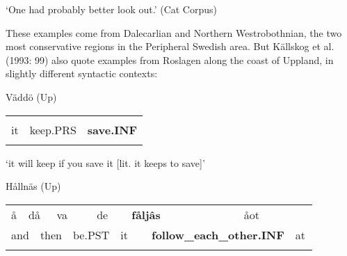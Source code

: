 \begin{styleTranslation}
‘One had probably better look out.’ (Cat Corpus)

\end{styleTranslation}

\begin{styleBodyTextFirst}
These examples come from Dalecarlian and Northern Westrobothnian, the two most conservative regions in the Peripheral Swedish area. But Källskog et al. (1993: 99) also quote examples from Roslagen along the coast of Uppland, in slightly different syntactic contexts:

\end{styleBodyTextFirst}

\begin{listWWNumileveli}
\item {}

\begin{styleExample}
Väddö (Up)

\end{styleExample}

\end{listWWNumileveli}

\begin{tabular}{lll}
\lsptoprule
\multicolumn{3}{l}{de

}\\
it & keep.PRS & {\bfseries save.INF}\\
\lspbottomrule
\end{tabular}

\begin{styleTranslation}
‘it will keep if you save it [lit. it keeps to save]’

\end{styleTranslation}

\begin{listWWNumileveli}
\item {}

\begin{styleExample}
Hållnäs (Up)

\end{styleExample}

\end{listWWNumileveli}

\begin{tabular}{llllllllllll}
\lsptoprule
å & \multicolumn{2}{l}{då

} & \multicolumn{2}{l}{va

} & \multicolumn{2}{l}{de

} & \multicolumn{2}{l}{{\bfseries fåljâs}

} & \multicolumn{2}{l}{åot

} & \\
\multicolumn{2}{l}{and

} & \multicolumn{2}{l}{then

} & \multicolumn{2}{l}{be.PST

} & \multicolumn{2}{l}{it

} & \multicolumn{2}{l}{{\bfseries follow\_each\_other.INF}

} & \multicolumn{2}{l}{at

}\\
\lspbottomrule
\end{tabular}

